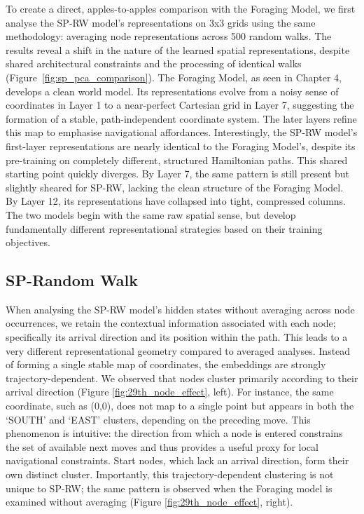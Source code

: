 To create a direct, apples-to-apples comparison with the Foraging Model, we first analyse the SP-RW model's representations on 3x3 grids using the same methodology: averaging node representations across 500 random walks. The results reveal a shift in the nature of the learned spatial representations, despite shared architectural constraints and the processing of identical walks (Figure~\ref{fig:sp_pca_comparison}). The Foraging Model, as seen in Chapter 4, develops a clean world model. Its representations evolve from a noisy sense of coordinates in Layer 1 to a near-perfect Cartesian grid in Layer 7, suggesting the formation of a stable, path-independent coordinate system. The later layers refine this map to emphasise navigational affordances. Interestingly, the SP-RW model's first-layer representations are nearly identical to the Foraging Model's, despite its pre-training on completely different, structured Hamiltonian paths. This shared starting point quickly diverges. By Layer 7, the same pattern is still present but slightly sheared for SP-RW, lacking the clean structure of the Foraging Model. By Layer 12, its representations have collapsed into tight, compressed columns. The two models begin with the same raw spatial sense, but develop fundamentally different representational strategies based on their training objectives.

\subsection{SP-Random Walk}

When analysing the SP-RW model’s hidden states without averaging across node occurrences, we retain the contextual information associated with each node; specifically its arrival direction and its position within the path. This leads to a very different representational geometry compared to averaged analyses. Instead of forming a single stable map of coordinates, the embeddings are strongly trajectory-dependent. We observed that nodes cluster primarily according to their arrival direction (Figure \ref{fig:29th_node_effect}, left). For instance, the same coordinate, such as (0,0), does not map to a single point but appears in both the `SOUTH' and `EAST' clusters, depending on the preceding move. This phenomenon is intuitive: the direction from which a node is entered constrains the set of available next moves and thus provides a useful proxy for local navigational constraints. Start nodes, which lack an arrival direction, form their own distinct cluster. Importantly, this trajectory-dependent clustering is not unique to SP-RW; the same pattern is observed when the Foraging model is examined without averaging (Figure \ref{fig:29th_node_effect}, right).

